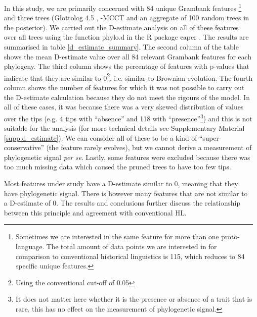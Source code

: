 \documentclass[12pt,letterpaper]{article}
\begin{document}
In this study, we are primarily concerned with 84 unique Grambank features \footnote{Sometimes we are interested in the same feature for more than one proto-language. The total amount of data points we are interested in for comparison to conventional historical linguistics is 115, which reduces to 84 specific unique features.} and three trees (Glottolog 4.5 \citep{glottolog4_5}, \citet{grayetal_2009}-MCCT and an aggregate of 100 random trees in the \citet{grayetal_2009} posterior). We carried out the D-estimate analysis on all of these features over all trees using the function phylo.d in the R package caper \citep{orme2013caper}. The results are summarised in table \ref{d_estimate_summary}. The second column of the table shows the mean D-estimate value over all 84 relevant Grambank features for each phylogeny. The third column shows the percentage of features with p-values that indicate that they are similar to 0\footnote{Using the conventional cut-off of 0.05}, i.e. similar to Brownian evolution. The fourth column shows the number of features for which it was not possible to carry out the D-estimate calculation because they do not meet the rigours of the model. In all of these cases, it was because there was a very skewed distribution of values over the tips (e.g. 4 tips with ``absence'' and 118 with ``presence''\footnote{It does not matter here whether it is the presence or absence of a trait that is rare, this has no effect on the measurement of phylogenetic signal.}) and this is not suitable for the analysis (for more technical details see Supplementary Material \ref{supp:d_estimate}). We can consider all of these to be a kind of ``super-conservative'' (the feature rarely evolves), but we cannot derive a measurement of phylogenetic signal \emph{per se}. Lastly, some features were excluded because there was too much missing data which caused the pruned trees to have too few tips.



Most features under study have a D-estimate similar to 0, meaning that they have phylogenetic signal. There is however many features that are not similar to a D-estimate of 0. The results and conclusions further discuss the relationship between this principle and agreement with conventional HL.
\end{document}
